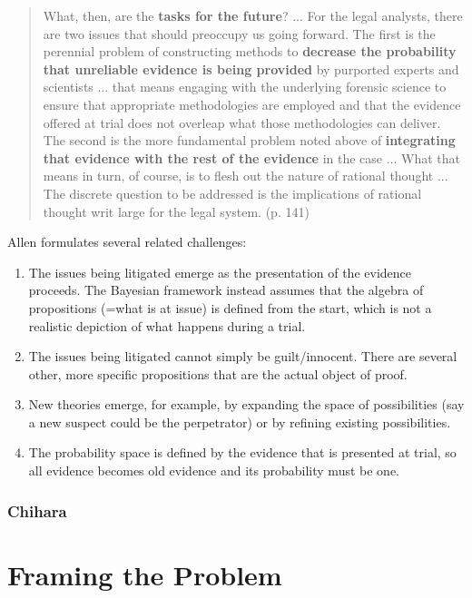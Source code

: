 \documentclass[
  11pt,
  dvipsnames,enabledeprecatedfontcommands]{scrartcl}
\begin{document}
\begin{quote}
What, then, are the \textbf{tasks for the future}? ... For the legal
analysts, there are two issues that should preoccupy us going forward. The first is the perennial problem
of constructing methods to \textbf{decrease the probability that unreliable evidence is being provided} by
purported experts and scientists ... that means engaging with the underlying forensic science to ensure that appropriate methodologies are employed and that the evidence offered at trial does not overleap what those methodologies can deliver. The second is the more fundamental problem noted above of \textbf{integrating that evidence with the rest of the evidence} in the case ... What that means in turn, of course, is to flesh out the nature of rational thought ... The discrete question to be addressed is the implications of rational thought writ large for the legal system. (p. 141) 
\end{quote}

Allen formulates several related challenges:

\begin{enumerate}
\def\labelenumi{\arabic{enumi}.}
\item
  The issues being litigated emerge as the presentation of the evidence
  proceeds. The Bayesian framework instead assumes that the algebra of
  propositions (=what is at issue) is defined from the start, which is
  not a realistic depiction of what happens during a trial.
\item
  The issues being litigated cannot simply be guilt/innocent. There are
  several other, more specific propositions that are the actual object
  of proof.
\item
  New theories emerge, for example, by expanding the space of
  possibilities (say a new suspect could be the perpetrator) or by
  refining existing possibilities.
\item
  The probability space is defined by the evidence that is presented at
  trial, so all evidence becomes old evidence and its probability must
  be one.
\end{enumerate}

\hypertarget{chihara}{%
\subsubsection{Chihara}\label{chihara}}

\hypertarget{framing-the-problem}{%
\section{Framing the Problem}\label{framing-the-problem}}
\end{document}

